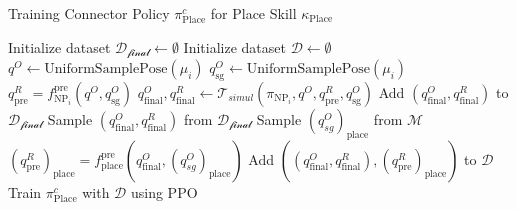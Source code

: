 \begin{algorithm}[H]
\caption{Training Connector Policy $\pi^c_{\text{Place}}$ for Place Skill $\kappa_{\text{Place}}$}\label{algo:train_connector_P}
\begin{algorithmic}[1]
\State Initialize dataset $\mathcal{D_{\text{final}}} \leftarrow \emptyset$
\State Initialize dataset $\mathcal{D} \leftarrow \emptyset$
        \State $q^O \leftarrow \text{UniformSamplePose}(\mu_i)$
        \State $q^O_{\text{sg}} \leftarrow \text{UniformSamplePose}(\mu_i)$
            \State $q^R_{\text{pre}} = f^{\text{pre}}_{\text{NP}_i}(q^O, q^O_{\text{sg}})$
            \State $q^O_{\text{final}}, q^R_{\text{final}} \leftarrow \mathcal{T}_{simul}(\pi_{\text{NP}_i}, q^O, q^R_{\text{pre}}, q^O_{\text{sg}})$
                \State Add $(q^O_{\text{final}}, q^R_{\text{final}})$ to $\mathcal{D_{\text{final}}}$
            \EndIf
        \EndIf
    \EndFor
    \State Sample $(q^O_{\text{final}}, q^R_{\text{final}})$ from $\mathcal{D_{\text{final}}}$
    \State Sample $(q^O_{sg})_{\text{place}}$ from $\mathcal{M}$
        \State $(q^R_{\text{pre}})_{\text{place}} = f^{\text{pre}}_{\text{place}}(q^O_{\text{final}}, (q^O_{sg})_{\text{place}})$
        \State Add $((q^O_{\text{final}}, q^R_{\text{final}}), (q^R_{\text{pre}})_{\text{place}})$ to $\mathcal{D}$
    \EndIf
\EndWhile
\State Train $\pi^c_{\text{Place}}$ with $\mathcal{D}$ using PPO
\end{algorithmic}
\end{algorithm}